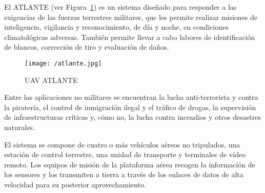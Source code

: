 El \acs{ATLANTE} (ver Figura~\ref{fig:atlante}) es un sistema diseñado para responder a las exigencias de las fuerzas terrestres militares, que les permite realizar misiones de inteligencia, vigilancia y reconocimiento, de día y noche, en condiciones climatológicas adversas. También permite llevar a cabo labores de identificación de blancos, corrección de tiro y evaluación de daños.

\begin{figure}[!h]
\begin{center}
\texttt{[image: /atlante.jpg]}
\caption[\acs{UAV} \acs{ATLANTE}]{\acs{UAV} \acs{ATLANTE}}
\label{fig:atlante}
\end{center}
\end{figure}

Entre las aplicaciones no militares se encuentran la lucha anti-terrorista y contra la piratería, el control de inmigración ilegal y el tráfico de drogas, la supervisión de infraestructuras críticas y, cómo no, la lucha contra incendios y otros desastres naturales.

El sistema se compone de cuatro o más vehículos aéreos no tripulados, una estación de control terrestre, una unidad de transporte y terminales de vídeo remoto. Los equipos de misión de la plataforma aérea recogen la información de los sensores y los transmiten a tierra a través de los enlaces de datos de alta velocidad para su posterior aprovechamiento.


